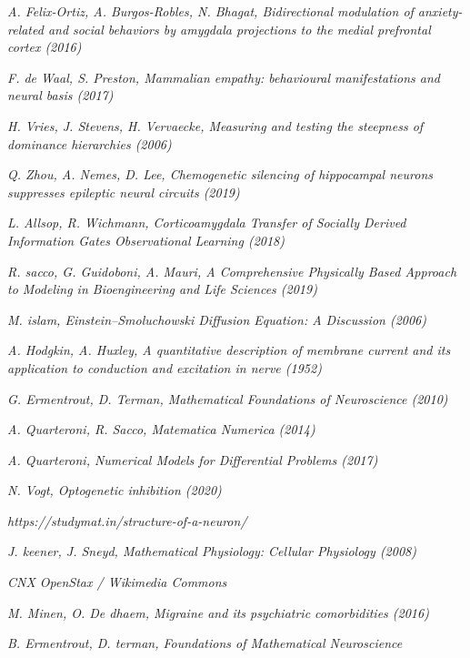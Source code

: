 \documentclass[12pt, a4paper]{report}
\begin{document}
\begin{thebibliography}{50}
	\textit{A. Felix-Ortiz, A. Burgos-Robles, N. Bhagat, Bidirectional modulation of anxiety-related and social behaviors by amygdala projections to the medial prefrontal cortex  (2016)}
	
	\textit{F. de Waal, S. Preston, Mammalian empathy: behavioural manifestations and neural basis (2017)}
	
	\textit{H. Vries, J. Stevens, H. Vervaecke, Measuring and testing the steepness of dominance hierarchies (2006)}
	
	\textit{Q. Zhou, A. Nemes, D. Lee, Chemogenetic silencing of hippocampal neurons suppresses epileptic neural circuits (2019)}
	
	\textit{L. Allsop, R. Wichmann, Corticoamygdala Transfer of Socially Derived Information Gates Observational Learning (2018)}
	
	\textit{R. sacco, G. Guidoboni, A. Mauri, A Comprehensive Physically Based Approach to Modeling in Bioengineering and Life Sciences (2019)}
	
	\textit{M. islam, Einstein–Smoluchowski Diffusion Equation: A Discussion (2006)}
	
	\textit{A. Hodgkin, A. Huxley, A quantitative description of membrane current and its application to conduction 
		and excitation in nerve (1952)}
	
	\textit{G. Ermentrout, D. Terman, Mathematical Foundations of Neuroscience (2010)}
	
	\textit{A. Quarteroni, R. Sacco, Matematica Numerica (2014)}
	
	\textit{A. Quarteroni, Numerical Models for Differential Problems (2017)}
	
	\textit{N. Vogt, Optogenetic inhibition (2020)}
	
	\textit{https://studymat.in/structure-of-a-neuron/}
	
	\textit{J. keener, J. Sneyd, Mathematical Physiology: Cellular Physiology (2008)}
	
	\textit{CNX OpenStax / Wikimedia Commons}
	
	\textit{M. Minen, O. De dhaem, Migraine and its psychiatric comorbidities (2016)}
	
	\textit{B. Ermentrout, D. terman, Foundations of
		Mathematical Neuroscience}
	
\end{thebibliography}
\end{document}
